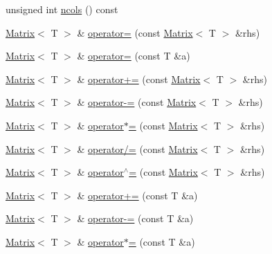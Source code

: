 \begin{DoxyCompactItemize}
\item 
unsigned int \mbox{\hyperlink{classMatrix_aa62107f075998f969b39fcb1bef20c44_aa62107f075998f969b39fcb1bef20c44}{ncols}} () const
\item 
\mbox{\hyperlink{classMatrix}{Matrix}}$<$ T $>$ \& \mbox{\hyperlink{classMatrix_a01990eb2552555d37c83272125be68e6_a01990eb2552555d37c83272125be68e6}{operator=}} (const \mbox{\hyperlink{classMatrix}{Matrix}}$<$ T $>$ \&rhs)
\item 
\mbox{\hyperlink{classMatrix}{Matrix}}$<$ T $>$ \& \mbox{\hyperlink{classMatrix_a603960a94121d9b35509199de88d1a92_a603960a94121d9b35509199de88d1a92}{operator=}} (const T \&a)
\item 
\mbox{\hyperlink{classMatrix}{Matrix}}$<$ T $>$ \& \mbox{\hyperlink{classMatrix_a36fdb87d0aa1b906eda9fa1cf81a1477_a36fdb87d0aa1b906eda9fa1cf81a1477}{operator+=}} (const \mbox{\hyperlink{classMatrix}{Matrix}}$<$ T $>$ \&rhs)
\item 
\mbox{\hyperlink{classMatrix}{Matrix}}$<$ T $>$ \& \mbox{\hyperlink{classMatrix_a50e2998bc90012d77efc0ff39d089336_a50e2998bc90012d77efc0ff39d089336}{operator-\/=}} (const \mbox{\hyperlink{classMatrix}{Matrix}}$<$ T $>$ \&rhs)
\item 
\mbox{\hyperlink{classMatrix}{Matrix}}$<$ T $>$ \& \mbox{\hyperlink{classMatrix_af6a95588910fa9c53feaae71fe88df81_af6a95588910fa9c53feaae71fe88df81}{operator$\ast$=}} (const \mbox{\hyperlink{classMatrix}{Matrix}}$<$ T $>$ \&rhs)
\item 
\mbox{\hyperlink{classMatrix}{Matrix}}$<$ T $>$ \& \mbox{\hyperlink{classMatrix_aab1b305350c7547ee31f0eeb92fc8c4a_aab1b305350c7547ee31f0eeb92fc8c4a}{operator/=}} (const \mbox{\hyperlink{classMatrix}{Matrix}}$<$ T $>$ \&rhs)
\item 
\mbox{\hyperlink{classMatrix}{Matrix}}$<$ T $>$ \& \mbox{\hyperlink{classMatrix_acf14abe2000a4a41dae10db14b5d039c_acf14abe2000a4a41dae10db14b5d039c}{operator$^\wedge$=}} (const \mbox{\hyperlink{classMatrix}{Matrix}}$<$ T $>$ \&rhs)
\item 
\mbox{\hyperlink{classMatrix}{Matrix}}$<$ T $>$ \& \mbox{\hyperlink{classMatrix_a5aeaf1a90547b2288646d57143d5518c_a5aeaf1a90547b2288646d57143d5518c}{operator+=}} (const T \&a)
\item 
\mbox{\hyperlink{classMatrix}{Matrix}}$<$ T $>$ \& \mbox{\hyperlink{classMatrix_a8776d41fcbbc1fc08425492576cf6786_a8776d41fcbbc1fc08425492576cf6786}{operator-\/=}} (const T \&a)
\item 
\mbox{\hyperlink{classMatrix}{Matrix}}$<$ T $>$ \& \mbox{\hyperlink{classMatrix_a9ac358ade86c1b442aa75852b2dd663a_a9ac358ade86c1b442aa75852b2dd663a}{operator$\ast$=}} (const T \&a)

\end{DoxyCompactItemize}
